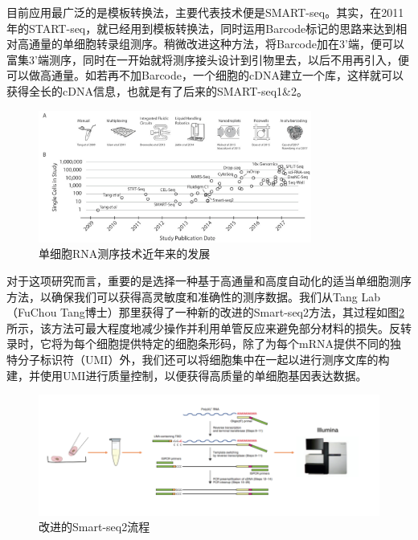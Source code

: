   目前应用最广泛的是模板转换法，主要代表技术便是SMART-seq\cite{ramskold2012full,picelli2013smart}。其实，在2011年的START-seq\cite{islam2011characterization}，就已经用到模板转换法，同时运用Barcode标记的思路来达到相对高通量的单细胞转录组测序。稍微改进这种方法，将Barcode加在3'端，便可以富集3'端测序，同时在一开始就将测序接头设计到引物里去，以后不用再引入，便可以做高通量。如若再不加Barcode，一个细胞的cDNA建立一个库，这样就可以获得全长的cDNA信息，也就是有了后来的SMART-seq1\&2。

\begin{figure}[!htb]
  \centering
  \includegraphics[width=0.8\textwidth]{figs/scseq-development.jpeg}
  \caption{单细胞RNA测序技术近年来的发展}
  \label{fig:scseq-development}
\end{figure}

  对于这项研究而言，重要的是选择一种基于高通量和高度自动化的适当单细胞测序方法，以确保我们可以获得高灵敏度和准确性的测序数据。我们从Tang Lab（FuChou Tang博士）那里获得了一种新的改进的Smart-seq2方法，其过程如图\ref{fig:scseq-smart}所示，该方法可最大程度地减少操作并利用单管反应来避免部分材料的损失。反转录时，它将为每个细胞提供特定的细胞条形码，除了为每个mRNA提供不同的独特分子标识符（UMI）外，我们还可以将细胞集中在一起以进行测序文库的构建，并使用UMI进行质量控制，以便获得高质量的单细胞基因表达数据。

\begin{figure}[!htb]
  \centering
  \includegraphics[width=1.0\textwidth]{figs/scseq-smart.png}
  \caption{改进的Smart-seq2流程}
  \label{fig:scseq-smart}
\end{figure}

